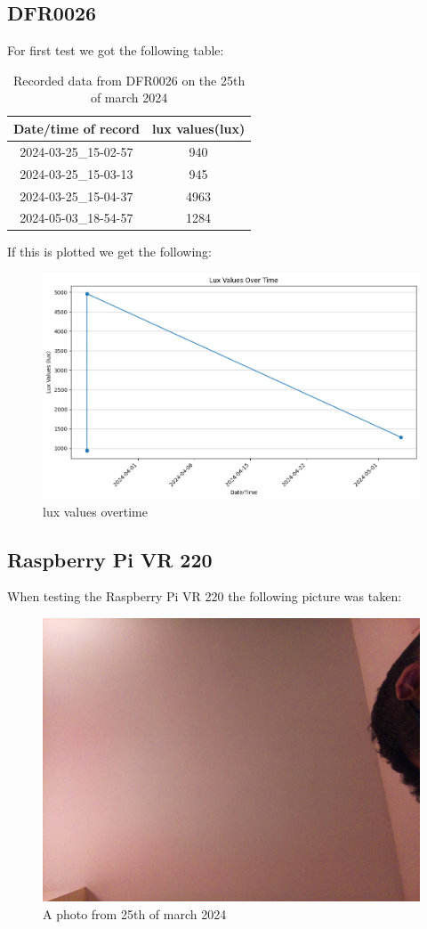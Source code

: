 \subsection{DFR0026}
For first test we got  the following table: 
\begin{table}[h!]
    \centering
    \begin{tabular}{|c|c|}
        \hline
        Date/time of record & lux values(lux)\\
        \hline \hline
        2024-03-25_15-02-57&940\\
        2024-03-25_15-03-13&945\\
        2024-03-25_15-04-37&4963\\
        2024-05-03_18-54-57&1284
        \hline
    \end{tabular}
    \caption{Recorded data from DFR0026 on the 25th of march 2024}
    \label{Recorded data from DFR0026 on the 25th of march 2024}
\end{table}
If this is plotted we get the following:
\begin{figure}[h!]
    \centering
    \includegraphics[width=0.5\linewidth]{Images/lux_values_overtime.png}
    \caption{lux values overtime}
    \label{lux values overtime}
\end{figure}
\newpage
\subsection{Raspberry Pi VR 220}
When testing  the Raspberry Pi VR 220 the following picture was taken:
\begin{figure}[h!]
    \centering
    \includegraphics[width=0.4\linewidth]{Images/camera_output_2024-03-21_21-43-16.png}
    \caption{A photo from 25th of march 2024 }
    \label{A photo from 25th of march 2024}
\end{figure}

